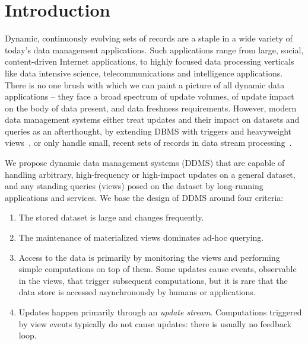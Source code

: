 


\section{Introduction}
\label{sec:intro}


Dynamic, continuously evolving sets of records are a staple in a wide variety of
today's data management applications. Such applications range from large,
social, content-driven Internet applications, to highly focused data processing
verticals like data intensive science, telecommunications and intelligence
applications. There is no one brush with which we can paint a picture of all
dynamic data applications -- they face a broad spectrum of update volumes, of
update impact on the body of data present, and data freshness requirements.
However, modern data management systems either treat updates and their impact on
datasets and queries as an afterthought, by extending DBMS with triggers and
heavyweight views~\cite{griffin-sigmod:95, bello-vldb:98, zhou-vldb:07,
zhou-icde:07}, or only handle small, recent sets of records in data stream
processing~\cite{abadi-vldbj:03, demers-sigmod:07, motwani-cidr:03,
chandrasekaran-cidr:03}.

We propose dynamic data management systems (DDMS) that are capable of handling
arbitrary, high-frequency or high-impact updates on a general dataset,
and any standing queries (views) posed on the dataset by long-running
applications and services. We base the design of DDMS around four criteria:

\begin{enumerate}
\item
The stored dataset is large and changes frequently.

\item 
The
maintenance of materialized views dominates ad-hoc querying.

\item
Access to the data is primarily by monitoring the views and performing
simple computations on top of them.
Some updates cause events, observable in the views, that trigger subsequent
computations, but it is rare that the data store is accessed asynchronously by
humans or applications.

\item
Updates happen primarily through an {\em update stream}\/. Computations
triggered by view events typically do not cause updates: there is usually no
feedback loop.
\end{enumerate}

